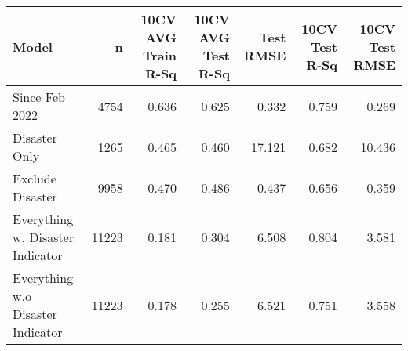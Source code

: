 
\begin{tabular}{l|r|r|r|r|r|r}
\hline
Model & n & 10CV AVG Train R-Sq & 10CV AVG Test R-Sq & Test RMSE & 10CV Test R-Sq & 10CV Test RMSE\\
\hline
Since Feb 2022 & 4754 & 0.636 & 0.625 & 0.332 & 0.759 & 0.269\\
\hline
Disaster Only & 1265 & 0.465 & 0.460 & 17.121 & 0.682 & 10.436\\
\hline
Exclude Disaster & 9958 & 0.470 & 0.486 & 0.437 & 0.656 & 0.359\\
\hline
Everything w. Disaster Indicator & 11223 & 0.181 & 0.304 & 6.508 & 0.804 & 3.581\\
\hline
Everything w.o Disaster Indicator & 11223 & 0.178 & 0.255 & 6.521 & 0.751 & 3.558\\
\hline
\end{tabular}
